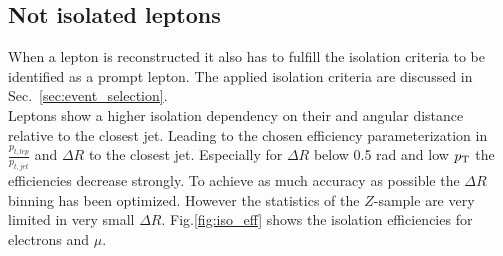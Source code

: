 \subsection{Not isolated leptons}
\label{sec:isolation}
When a lepton is reconstructed it also has to fulfill the isolation criteria to be identified as a prompt lepton.
The applied isolation criteria are discussed in Sec.~\ref{sec:event_selection}.\\
Leptons show a higher isolation dependency on their \pt and angular distance relative to the closest jet.
Leading to the chosen efficiency parameterization in $\frac{p_{t,lep}}{p_{t,jet}}$ and $\Delta R$ to the closest jet. Especially for $\Delta R$ below 0.5 rad and low $p_{\text{T}}$ the efficiencies decrease strongly. To achieve as much accuracy as possible the $\Delta R$ binning has been optimized. However the statistics of the $Z$-sample are very limited in very small $\Delta R$. Fig.\ref{fig:iso_eff} shows the isolation efficiencies for electrons and $\mu$.
